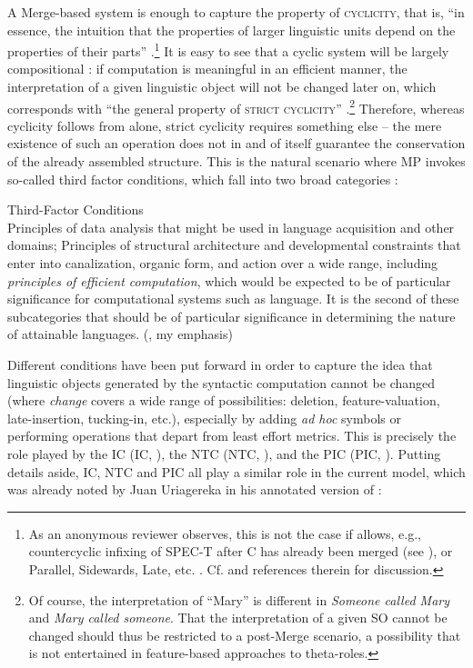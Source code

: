 \documentclass[output=paper]{langsci/langscibook}
\begin{document}
A Merge-based system is enough to capture the property of \textsc{cyclicity},
that is, “in essence, the intuition that the properties of larger linguistic
units depend on the properties of their parts”
\citep[1]{Chomsky2012}.\footnote{As an anonymous reviewer observes, this is not
the case if  allows, e.g., countercyclic infixing of SPEC-T after C has
already been merged (see \citealt{Chomsky2008}), or Parallel, Sidewards, Late,
etc. . Cf. \citet{ChoGalOtt2019} and references therein for discussion.}
It is easy to see that a cyclic system will be largely compositional
\parencites[5]{Chomsky2007}[2]{Chomsky2012}: if computation is meaningful in an
efficient manner, the interpretation of a given linguistic object will not be
changed later on, which corresponds with “the general property of
\textsc{strict cyclicity}” \citep[5]{Chomsky2007}.\footnote{Of course, the
    interpretation of “Mary” is different in \emph{Someone called Mary} and
    \emph{Mary called someone}. That the interpretation of a given
    \gls{SO} cannot
    be changed should thus be restricted to a post-Merge scenario, a
    possibility that is not entertained in feature-based approaches to
theta-roles.} Therefore, whereas cyclicity follows from  alone,
strict cyclicity requires something else -- the mere existence of such an
operation does not in and of itself guarantee the conservation of the already
assembled structure.  This is the natural scenario where \gls{MP} invokes
so-called third factor conditions, which fall into two broad categories
\citep{Chomsky2005}:

\ea%
    \label{ex:key:34.2}Third-Factor Conditions\\
    \ea Principles of data analysis that might be used in language acquisition
    and other domains;
    \ex Principles of structural architecture and developmental constraints
    that enter into canalization, organic form, and action over a wide range,
    including \emph{principles of efficient computation}, which would be
    expected to be of particular significance for computational systems such as
    language. It is the second of these subcategories that should be of
    particular significance in determining the nature of attainable languages.
    (\citealt[6]{Chomsky2005}, my emphasis)
    \z
\z

Different conditions have been put forward in order to capture the idea that
linguistic objects generated by the syntactic computation cannot be changed
(where \emph{change} covers a wide range of possibilities: deletion,
feature-valuation, late-insertion, tucking-in, etc.), especially by adding
\emph{ad hoc} symbols or performing operations that depart from least effort
metrics. This is precisely the role played by the
\textsc{\glsdesc{IC}} (\gls{IC},
\citealt[228]{Chomsky1995}), the \textsc{\glsdesc{NTC}}
(\gls{NTC}, \citealt[138]{Chomsky2008}), and the
\textsc{\glsdesc{PIC}} (\gls{PIC},
\citealt{Chomsky2000}). Putting details aside, \gls{IC}, \gls{NTC} and
\gls{PIC} all play a similar role in the current model, which was already noted
by Juan Uriagereka in his annotated version of \citet{Chomsky2001}:
\end{document}
